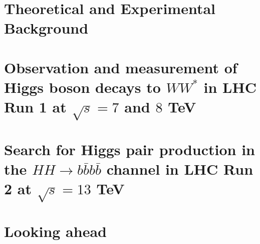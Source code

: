 \documentclass{Dissertate}
\begin{document}


\maketitle
\copyrightpage

\abstractpage
\tableofcontents
\listoffigures
\listoftables
\dedicationpage
\acknowledgments

\doublespacing

\setcounter{chapter}{-1}  %

\part{Theoretical and Experimental Background}



\part{Observation and measurement of Higgs boson decays to $WW^*$ in LHC Run 1 at $\sqrt{s} = 7$ and $8$ TeV}









\part{Search for Higgs pair production in the $HH\rightarrow
  b\bar{b}b\bar{b}$ channel in LHC Run 2 at $\sqrt{s} = 13$ TeV}






\part{Looking ahead}

\begin{appendices}
   
\end{appendices}


\clearpage
{}


%

%
\end{document}
